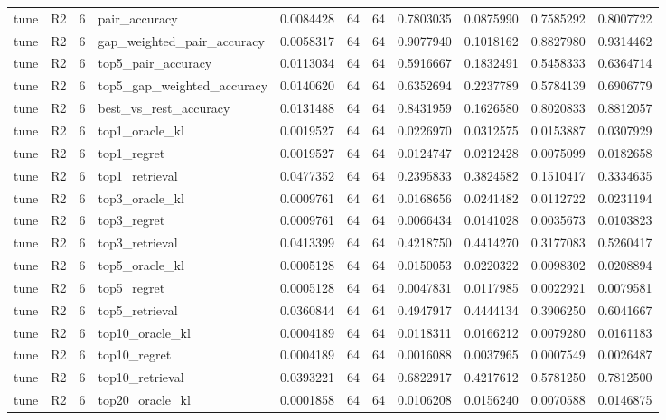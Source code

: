 \begin{tabular}{llrlrrrrrrr}
tune & R2 & 6 & pair_accuracy & 0.0084428 & 64 & 64 & 0.7803035 & 0.0875990 & 0.7585292 & 0.8007722 \\
tune & R2 & 6 & gap_weighted_pair_accuracy & 0.0058317 & 64 & 64 & 0.9077940 & 0.1018162 & 0.8827980 & 0.9314462 \\
tune & R2 & 6 & top5_pair_accuracy & 0.0113034 & 64 & 64 & 0.5916667 & 0.1832491 & 0.5458333 & 0.6364714 \\
tune & R2 & 6 & top5_gap_weighted_accuracy & 0.0140620 & 64 & 64 & 0.6352694 & 0.2237789 & 0.5784139 & 0.6906779 \\
tune & R2 & 6 & best_vs_rest_accuracy & 0.0131488 & 64 & 64 & 0.8431959 & 0.1626580 & 0.8020833 & 0.8812057 \\
tune & R2 & 6 & top1_oracle_kl & 0.0019527 & 64 & 64 & 0.0226970 & 0.0312575 & 0.0153887 & 0.0307929 \\
tune & R2 & 6 & top1_regret & 0.0019527 & 64 & 64 & 0.0124747 & 0.0212428 & 0.0075099 & 0.0182658 \\
tune & R2 & 6 & top1_retrieval & 0.0477352 & 64 & 64 & 0.2395833 & 0.3824582 & 0.1510417 & 0.3334635 \\
tune & R2 & 6 & top3_oracle_kl & 0.0009761 & 64 & 64 & 0.0168656 & 0.0241482 & 0.0112722 & 0.0231194 \\
tune & R2 & 6 & top3_regret & 0.0009761 & 64 & 64 & 0.0066434 & 0.0141028 & 0.0035673 & 0.0103823 \\
tune & R2 & 6 & top3_retrieval & 0.0413399 & 64 & 64 & 0.4218750 & 0.4414270 & 0.3177083 & 0.5260417 \\
tune & R2 & 6 & top5_oracle_kl & 0.0005128 & 64 & 64 & 0.0150053 & 0.0220322 & 0.0098302 & 0.0208894 \\
tune & R2 & 6 & top5_regret & 0.0005128 & 64 & 64 & 0.0047831 & 0.0117985 & 0.0022921 & 0.0079581 \\
tune & R2 & 6 & top5_retrieval & 0.0360844 & 64 & 64 & 0.4947917 & 0.4444134 & 0.3906250 & 0.6041667 \\
tune & R2 & 6 & top10_oracle_kl & 0.0004189 & 64 & 64 & 0.0118311 & 0.0166212 & 0.0079280 & 0.0161183 \\
tune & R2 & 6 & top10_regret & 0.0004189 & 64 & 64 & 0.0016088 & 0.0037965 & 0.0007549 & 0.0026487 \\
tune & R2 & 6 & top10_retrieval & 0.0393221 & 64 & 64 & 0.6822917 & 0.4217612 & 0.5781250 & 0.7812500 \\
tune & R2 & 6 & top20_oracle_kl & 0.0001858 & 64 & 64 & 0.0106208 & 0.0156240 & 0.0070588 & 0.0146875 \\

\end{tabular}
